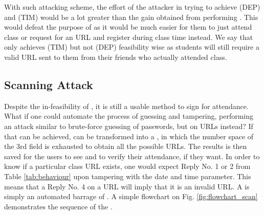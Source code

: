 \documentclass[runningheads]{llncs}
\begin{document}
With such attacking scheme, the effort of the attacker in trying to achieve (DEP) and (TIM) would be a lot greater than the gain obtained from performing \theattack{}. This would defeat the purpose of \theattack{} as it would be much easier for them to just attend class or request for an URL and register during class time instead. We say that \theattack{} only achieves (TIM) but not (DEP) feasibility wise as students will still require a valid URL sent to them from their friends who actually attended class.

\subsection{Scanning Attack}

Despite the in-feasibility of \theattack{}, it is still a usable method to sign for attendance. What if one could automate the process of guessing and tampering, performing an attack similar to brute-force guessing of passwords, but on URLs instead? If that can be achieved, \theattack{} can be transformed into a \scanattack{}, in which the number space of the 3rd field is exhausted to obtain all the possible URLs. The results is then saved for the users to see and to verify their attendance, if they want. In order to know if a particular class URL exists, one would expect Reply No. 1 or 2 from Table \ref{tab:behaviour} upon tampering with the date and time parameter. This means that a Reply No. 4 on a URL will imply that it is an invalid URL. A \scanattack{} is simply an automated barrage of \theattack{}. A simple flowchart on Fig. \ref{fig:flowchart_scan} demonstrates the sequence of the \scanattack{}.
\end{document}
